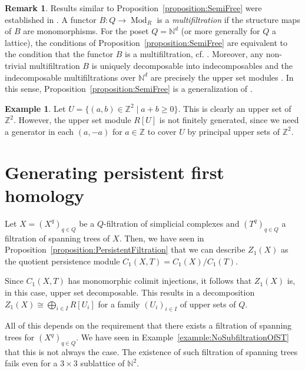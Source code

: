 \documentclass[oneside]{amsart}
\theoremstyle{definition}
\newtheorem{example}[theorem]{Example}
\newtheorem{remark}[theorem]{Remark}
\newcommand\Mod[1]{\operatorname{Mod}_{#1}}
\begin{document}
\begin{remark}
    Results similar to Proposition~\ref{proposition:SemiFree} were established in \cite{ChachólskiScolamieroVaccarino2017}.
    A functor $B\colon Q \to \Mod{R}$ is a \emph{multifiltration} if the structure maps of $B$ are monomorphisms.
    For the poset $Q = \mathbb N^d$ (or more generally for $Q$ a lattice), the conditions of Proposition~\ref{proposition:SemiFree} are equivalent to the condition that the functor $B$ is a multifiltration, cf. \cite[Proposition~3.3]{ChachólskiScolamieroVaccarino2017}.
    Moreover, any non-trivial multifiltration $B$ is uniquely decomposable into indecomposables and the indecomposable multifiltrations over $\mathbb N^d$ are precisely the upper set modules \cite[Proposition~3.1, Corollary~3.2]{ChachólskiScolamieroVaccarino2017}.
    In this sense, Proposition~\ref{proposition:SemiFree} is a generalization of \cite[Proposition~3.1]{ChachólskiScolamieroVaccarino2017}.
\end{remark}
\begin{example}
    Let $U = \{ (a, b) \in \mathbb Z^2 \mid a + b \geq 0 \}$.
    This is clearly an upper set of $\mathbb Z^2$.
    However, the upper set module $R[U]$ is not finitely generated, since we need a generator in each $(a, -a)$ for $a \in \mathbb Z$ to cover $U$ by principal upper sets of $\mathbb Z^2$.
\end{example}

\section{Generating  persistent first homology}
\label{section:GeneratingH1}
Let $X = (X^q)_{q \in Q}$ be a $Q$-filtration of simplicial complexes and $(T^q)_{q \in Q}$ a filtration of spanning trees of $X$.
Then, we have seen in Proposition~\ref{proposition:PersistentFiltration} that we can describe $Z_1(X)$ as the quotient persistence module $C_1(X, T) = C_1(X) / C_1(T)$.

Since $C_1(X, T)$ has monomorphic colimit injections, it follows that $Z_1(X)$ is, in this case, upper set decomposable.
This results in a decomposition $Z_1(X) \cong \bigoplus_{i \in I} R[U_i]$ for a family $(U_i)_{i \in I}$ of upper sets of $Q$.

All of this depends on the requirement that there exists a filtration of spanning trees for $(X^q)_{q \in Q}$.
We have seen in Example~\ref{example:NoSubfiltrationOfST} that this is not always the case.
The existence of such filtration of spanning trees fails even for a $3 \times 3$ sublattice of $\mathbb N^2$.
\end{document}
